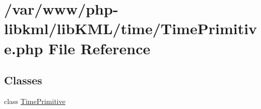 \hypertarget{TimePrimitive_8php}{
\section{/var/www/php-\/libkml/libKML/time/TimePrimitive.php File Reference}
\label{d9/d3f/TimePrimitive_8php}
}
\subsection*{Classes}
\begin{DoxyCompactItemize}
\item 
class \hyperlink{classTimePrimitive}{TimePrimitive}
\end{DoxyCompactItemize}
